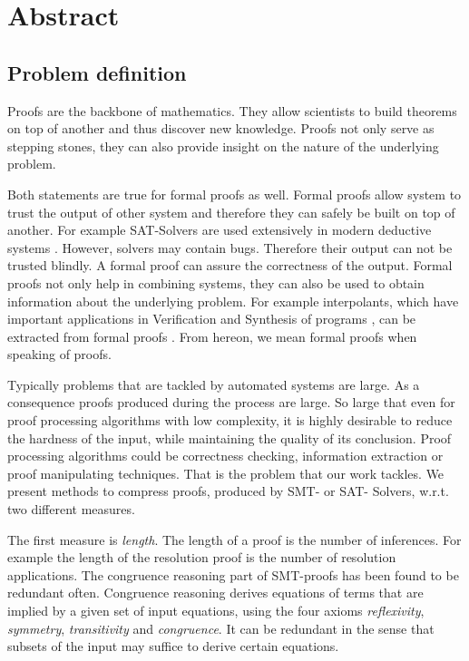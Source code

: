 \chapter*{Abstract}

\section{Problem definition}

Proofs are the backbone of mathematics. 
They allow scientists to build theorems on top of another and thus discover new knowledge.
Proofs not only serve as stepping stones, they can also provide insight on the nature of the underlying problem.

Both statements are true for formal proofs as well.
Formal proofs allow system to trust the output of other system and therefore they can safely be built on top of another. 
For example SAT-Solvers are used extensively in modern deductive systems \cite{Biere2009}. 
However, solvers may contain bugs. 
Therefore their output can not be trusted blindly.
A formal proof can assure the correctness of the output.
Formal proofs not only help in combining systems, they can also be used to obtain information about the underlying problem.
For example interpolants, which have important applications in Verification and Synthesis of programs \cite{McMill2005}, can be extracted from formal proofs \cite{Hofferek2013}.
From hereon, we mean formal proofs when speaking of proofs.

Typically problems that are tackled by automated systems are large. 
As a consequence proofs produced during the process are large.
So large that even for proof processing algorithms with low complexity, it is highly desirable to reduce the hardness of the input, while maintaining the quality of its conclusion.
Proof processing algorithms could be correctness checking, information extraction or proof manipulating techniques.
That is the problem that our work tackles.
We present methods to compress proofs, produced by SMT- or SAT- Solvers, w.r.t. two different measures.

The first measure is \emph{length}.
The length of a proof is the number of inferences.
For example the length of the resolution proof is the number of resolution applications.
The congruence reasoning part of SMT-proofs has been found to be redundant often.
Congruence reasoning derives equations of terms that are implied by a given set of input equations, 
using the four axioms \emph{reflexivity}, \emph{symmetry}, \emph{transitivity} and \emph{congruence}. 
It can be redundant in the sense that subsets of the input may suffice to derive certain equations.

